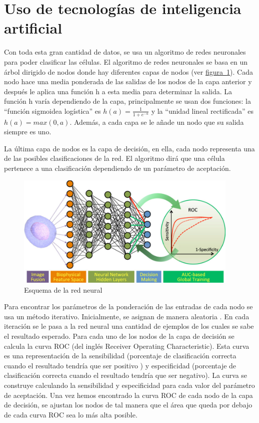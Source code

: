\documentclass[a4paper, 12pt, UTF8]{article}
\begin{document}
\section{Uso de tecnologías de inteligencia artificial}

Con toda esta gran cantidad de datos, se usa un algoritmo de redes neuronales para poder clasificar las células. El algoritmo de redes neuronales se basa en un árbol dirigido de nodos donde hay diferentes capas de nodos (ver \hyperref[fig:neural]{figura~\ref{fig:neural}}). Cada nodo hace una media ponderada de las salidas de los nodos de la capa anterior y después le aplica una función h a esta media para determinar la salida. La función h varía dependiendo de la capa, principalmente se usan dos funciones: la “función sigmoidea logística” es $h(a)=\frac{1}{1+e^{-a}}$ y la “unidad lineal rectificada” es $h(a)=max(0,a)$. Además, a cada capa se le añade un nodo que su salida siempre es uno. 
	
La última capa de nodos es la capa de decisión, en ella, cada nodo representa una de las posibles clasificaciones de la red. El algoritmo dirá que una célula pertenece a una clasificación dependiendo de un parámetro de aceptación.

\begin{figure}[h!]
	\centering
	\includegraphics[width=0.95\textwidth]{neural}
	\caption{Esquema de la red neural}
	\label{fig:neural}
\end{figure}

Para encontrar los parámetros de la ponderación de las entradas de cada nodo se usa un método iterativo. Inicialmente, se asignan de manera aleatoria \cite{training}. En cada iteración se le pasa a la red neural una cantidad de ejemplos de los cuales se sabe el resultado esperado. Para cada uno de los nodos de la capa de decisión se calcula la curva ROC \cite{roc} (del inglés Receiver Operating Characteristic). Esta curva es una representación de la sensibilidad  (porcentaje de clasificación correcta cuando el resultado tendría que ser positivo \cite{sensibilidad}) y especificidad (porcentaje de clasificación correcta cuando el resultado tendría que ser negativo). La curva se construye calculando la sensibilidad y especificidad para cada valor del parámetro de aceptación. Una vez hemos encontrado la curva ROC de cada nodo de la capa de decisión,  se ajustan los nodos de tal manera que el área que queda por debajo de cada curva ROC sea lo más alta posible.
\end{document}
